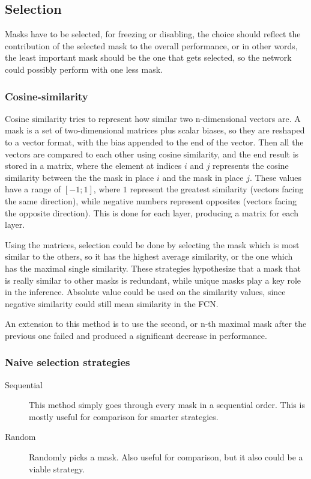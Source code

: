 \documentclass[12pt]{report}
\begin{document}
\subsection{Selection}
Masks have to be selected, for freezing or disabling, the choice should reflect the contribution of the selected mask to the overall performance, or in other words, the least important mask should be the one that gets selected, so the network could possibly perform with one less mask.
\subsubsection{Cosine-similarity}Cosine similarity  tries to represent how similar two n-dimensional vectors are. A mask is a set of two-dimensional matrices plus scalar biases, so they are reshaped to a vector format, with the bias appended to the end of the vector. Then all the vectors are compared to each other using cosine similarity, and the end result is stored in a matrix, where the element at indices $i$ and $j$ represents the cosine similarity between the the mask in place $i$ and the mask in place $j$. These values have a range of $\left[-1;1\right] $, where $1$ represent the greatest similarity (vectors facing the same direction), while negative numbers represent opposites (vectors facing the opposite direction). This is done for each layer, producing a matrix for each layer.

Using the matrices, selection could be done by selecting the mask which is most similar to the others, so it has the highest average similarity, or the one which has the maximal single similarity. These strategies hypothesize that a mask that is really similar to other masks is redundant, while unique masks play a key role in the inference. Absolute value could be used on the similarity values, since negative similarity could still mean similarity in the FCN.

An extension to this method is to use the second, or n-th maximal mask after the previous one failed and produced a significant decrease in performance.
\subsubsection{Naive selection strategies}
\begin{description}
	\item[Sequential] This method simply goes through every mask in a sequential order. This is mostly useful for comparison for smarter strategies.
	\item[Random] Randomly picks a mask. Also useful for comparison, but it also could be a viable strategy.
\end{description}
\end{document}
